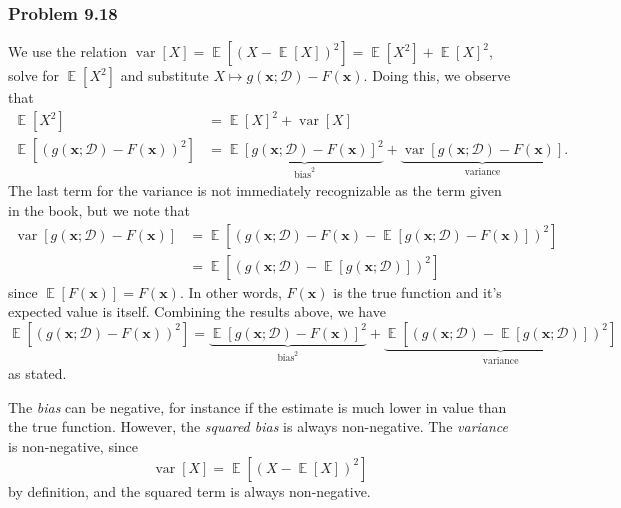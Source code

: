 \documentclass[12pt, a4paper]{article}
\newcommand{\D}{\mathcal{D}}
\newcommand{\vect}[1]{\bm{#1}}
\DeclareMathOperator{\E}{\mathbb{E}}
\DeclareMathOperator{\var}{\operatorname{var}}
\begin{document}
{\subsubsection*{Problem 9.18}
We use the relation $\var\left[ X \right] = \E\left[ (X -  \E\left[X \right])^2 \right] = \E \left[X^2\right] + \E \left[X\right]^2$, solve for $\E \left[X^2\right]$ and substitute $X \mapsto g(\vect{x}; \D) -F (\vect{x})$.
Doing this, we observe that
\begin{align*}
	\E \left[X^2\right] 
	&= \E \left[X\right]^2 +  \var\left[ X \right] 
	\\
	\E \left[\left(  g(\vect{x}; \D) -F (\vect{x}) \right)^2\right] 
	&= 
	\underbrace{\E \left[g(\vect{x}; \D) - F (\vect{x}) \right]^2}_{\text{bias}^2} +  
	\underbrace{\var\left[ g(\vect{x}; \D) -F (\vect{x}) \right] }_{\text{variance}}.
\end{align*}
The last term for the variance is not immediately recognizable as the term given in the book, but we note that
\begin{align*}
	\var\left[ g(\vect{x}; \D) -F (\vect{x}) \right]
	& =
	\E \left[ \left( g(\vect{x}; \D) -F (\vect{x}) - \E \left[ g(\vect{x}; \D) -F (\vect{x}) \right] \right)^2 \right] \\
	&= 
	\E \left[ \left( g(\vect{x}; \D)  - \E \left[ g(\vect{x}; \D) \right] \right)^2 \right]
\end{align*}
since $\E \left[ F (\vect{x}) \right] = F (\vect{x})$.
In other words,  $F (\vect{x})$ is the true function and it's expected value is itself.
Combining the results above, we have
\begin{equation*}
	\E \left[\left(  g(\vect{x}; \D) -F (\vect{x}) \right)^2\right] 
	= 
	\underbrace{\E \left[g(\vect{x}; \D) - F (\vect{x}) \right]^2}_{\text{bias}^2} +  
	\underbrace{\E \left[ \left( g(\vect{x}; \D)  - \E \left[ g(\vect{x}; \D) \right] \right)^2 \right]}_{\text{variance}}
\end{equation*}
as stated.

The \emph{bias} can be negative, for instance if the estimate is much lower in value than the true function. 
However, the \emph{squared bias} is always non-negative.
The \emph{variance} is non-negative, since
\begin{equation*}
	\var\left[ X \right] = \E\left[ (X -  \E\left[X \right])^2 \right]
\end{equation*}
by definition, and the squared term is always non-negative.




}
\end{document}
